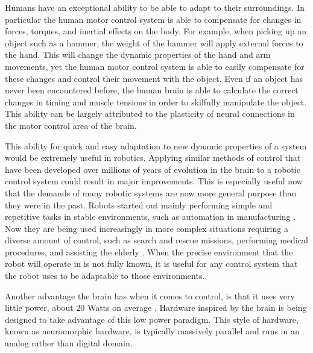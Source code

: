 \documentclass[letterpaper,12pt,titlepage,oneside,final]{book}
\begin{document}
Humans have an exceptional ability to be able to adapt to their surroundings.
In particular the human motor control system is able to compensate for changes in forces, torques, and inertial effects on the body.
For example, when picking up an object such as a hammer, the weight of the hammer will apply external forces to the hand.
This will change the dynamic properties of the hand and arm movements, yet the human motor control system is able to easily compensate for these changes and control their movement with the object.
Even if an object has never been encountered before, the human brain is able to calculate the correct changes in timing and muscle tensions in order to skilfully manipulate the object. %
This ability can be largely attributed to the plasticity of neural connections in the motor control area of the brain.

This ability for quick and easy adaptation to new dynamic properties of a system would be extremely useful in robotics. 
Applying similar methods of control that have been developed over millions of years of evolution in the brain to a robotic control system could result in major improvements. 
This is especially useful now that the demands of many robotic systems are now more general purpose than they were in the past. 
Robots started out mainly performing simple and repetitive tasks in stable environments, such as automation in manufacturing \cite{garcia2007evolution}. 
Now they are being used increasingly in more complex situations requiring a diverse amount of control, such as search and rescue missions, performing medical procedures, and assisting the elderly \cite{garcia2007evolution, hockstein2007history, nourbakhsh2005human, lacey1998application}. 
When the precise environment that the robot will operate in is not fully known, it is useful for any control system that the robot uses to be adaptable to those environments.

Another advantage the brain has when it comes to control, is that it uses very little power, about 20 Watts on average \cite{hart1975brain}.
Hardware inspired by the brain is being designed to take advantage of this low power paradigm. 
This style of hardware, known as neuromorphic hardware, is typically massively parallel and runs in an analog rather than digital domain.
\end{document}

